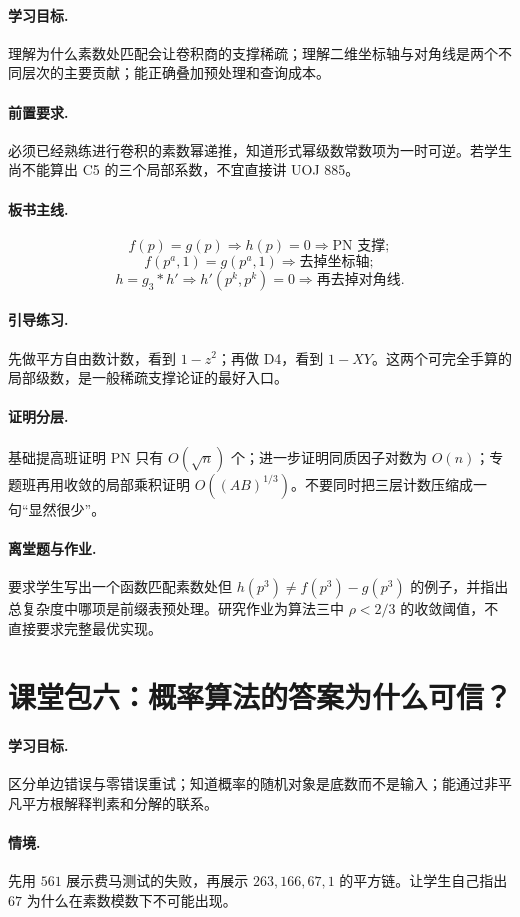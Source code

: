 \documentclass[UTF8,a4paper,11pt,twoside,openright,fontset=fandol]{ctexbook}
\theoremstyle{definition}
\begin{document}
\paragraph{学习目标.} 理解为什么素数处匹配会让卷积商的支撑稀疏；理解二维坐标轴与对角线是两个不同层次的主要贡献；能正确叠加预处理和查询成本。
\paragraph{前置要求.} 必须已经熟练进行卷积的素数幂递推，知道形式幂级数常数项为一时可逆。若学生尚不能算出 C5 的三个局部系数，不宜直接讲 UOJ 885。
\paragraph{板书主线.}
\[
 f(p)=g(p)\Rightarrow h(p)=0\Rightarrow\text{PN 支撑};
\]
\[
 f(p^a,1)=g(p^a,1)\Rightarrow\text{去掉坐标轴};
\]
\[
 h=g_3*h'\Rightarrow h'(p^k,p^k)=0\Rightarrow\text{再去掉对角线}.
\]
\paragraph{引导练习.} 先做平方自由数计数，看到 $1-z^2$；再做 D4，看到 $1-XY$。这两个可完全手算的局部级数，是一般稀疏支撑论证的最好入口。
\paragraph{证明分层.} 基础提高班证明 PN 只有 $O(\sqrt n)$ 个；进一步证明同质因子对数为 $O(n)$；专题班再用收敛的局部乘积证明 $O((AB)^{1/3})$。不要同时把三层计数压缩成一句“显然很少”。
\paragraph{离堂题与作业.} 要求学生写出一个函数匹配素数处但 $h(p^3)\ne f(p^3)-g(p^3)$ 的例子，并指出总复杂度中哪项是前缀表预处理。研究作业为算法三中 $\rho<2/3$ 的收敛阈值，不直接要求完整最优实现。

\section{课堂包六：概率算法的答案为什么可信？}
\paragraph{学习目标.} 区分单边错误与零错误重试；知道概率的随机对象是底数而不是输入；能通过非平凡平方根解释判素和分解的联系。
\paragraph{情境.} 先用 $561$ 展示费马测试的失败，再展示 $263,166,67,1$ 的平方链。让学生自己指出 $67$ 为什么在素数模数下不可能出现。
\end{document}
